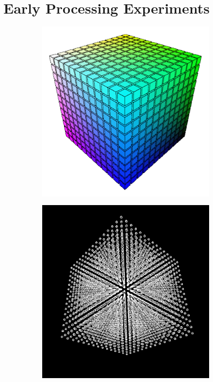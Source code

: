 \documentclass[12pt,twoside]{reedthesis}
\begin{document}
      \chapter{Early Processing Experiments}
      	\begin{figure}[H]
	\centering
	\begin{subfigure}{0.47\linewidth}
		\centering
		\includegraphics[width=\linewidth]{Images/ColorCube}
	\end{subfigure}%
	\hfill
	\begin{subfigure}{0.47\linewidth}
		\centering
		\includegraphics[width=\linewidth]{Images/CubeofCubes}
	\end{subfigure}
	

\end{figure}
\end{document}
